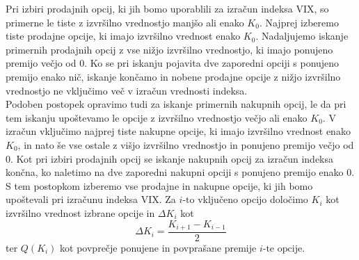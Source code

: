 \documentclass[12pt,a4paper, reqno]{amsart}
\theoremstyle{definition} %
\theoremstyle{plain} %
\begin{document}
Pri izbiri prodajnih opcij, ki jih bomo uporablili za izračun indeksa VIX, so primerne le tiste z izvršilno vrednostjo manjšo ali enako $K_0$. Najprej izberemo tiste prodajne opcije, ki imajo izvršilno vrednost enako $K_0$. Nadaljujemo iskanje primernih prodajnih opcij z vse nižjo izvršilno vrednostjo, ki imajo ponujeno premijo večjo od 0. Ko se pri iskanju pojavita dve zaporedni opciji s ponujeno premijo enako nič, iskanje končamo in nobene prodajne opcije z nižjo izvršilno vrednostjo ne vključimo več v izračun vrednosti indeksa.\\

Podoben postopek opravimo tudi za iskanje primernih nakupnih opcij, le da pri tem iskanju upoštevamo le opcije z izvršilno vrednostjo večjo ali enako $K_0$. V izračun vključimo najprej tiste nakupne opcije, ki imajo izvršilno vrednost enako $K_0$, in nato še vse ostale z višjo izvršilno vrednostjo in ponujeno premijo večjo od 0. Kot pri izbiri prodajnih opcij se iskanje nakupnih opcij za izračun indeksa končna, ko naletimo na dve zaporedni nakupni opciji s ponujeno premijo enako 0.\\

S tem postopkom izberemo vse prodajne in nakupne opcije, ki jih bomo upoštevali pri izračunu indeksa VIX.
Za $i\text{-to}$ vključeno opcijo določimo $K_i$ kot izvršilno vrednost izbrane opcije in $\Delta K_i$ kot
$$
\Delta K_i = \frac{K_{i+1} - K_{i-1}}{2}
$$
ter $Q(K_i)$ kot povprečje ponujene in povprašane premije $i\text{-te opcije}$.\\
\end{document}
